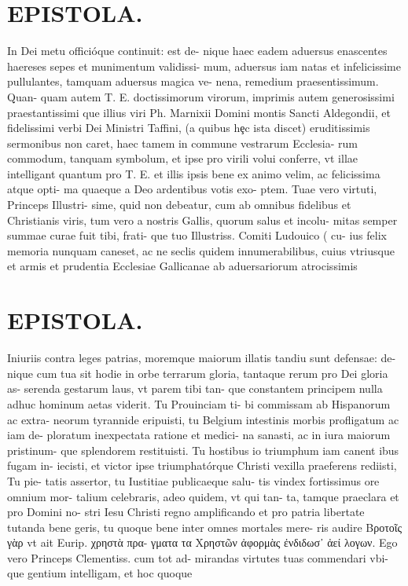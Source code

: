 \documentclass{article}
\begin{document}
\begin{pages}
\section*{EPISTOLA. }\pstart In Dei metu officióque continuit: est de- nique haec eadem aduersus enascentes haereses sepes et munimentum validissi- mum, aduersus iam natas et infelicissime pullulantes, tamquam aduersus magica ve- nena, remedium praesentissimum. Quan- quam autem T. E. doctissimorum virorum, imprimis autem generosissimi praestantissimi que illius viri Ph. Marnixii Domini montis Sancti Aldegondii, et fidelissimi verbi Dei Ministri Taffini, (a quibus hȩc ista discet) eruditissimis sermonibus non caret, haec tamem in commune vestrarum Ecclesia- rum commodum, tanquam symbolum, et ipse pro virili volui conferre, vt illae intelligant quantum pro T. E. et illis ipsis bene ex animo velim, ac felicissima atque opti- ma quaeque a Deo ardentibus votis exo- ptem. Tuae vero virtuti, Princeps Illustri- sime, quid non debeatur, cum ab omnibus fidelibus et Christianis viris, tum vero a nostris Gallis, quorum salus et incolu- mitas semper summae curae fuit tibi, frati- que tuo Illustriss. Comiti Ludouico ( cu- ius felix memoria nunquam caneset, ac ne seclis quidem innumerabilibus, cuius vtriusque et armis et prudentia Ecclesiae Gallicanae ab aduersariorum atrocissimis  \pend
\section*{EPISTOLA. }\pstart Iniuriis contra leges patrias, moremque maiorum illatis tandiu sunt defensae: de- nique cum tua sit hodie in orbe terrarum gloria, tantaque rerum pro Dei gloria as- serenda gestarum laus, vt parem tibi tan- que constantem principem nulla adhuc hominum aetas viderit. Tu Prouinciam ti- bi commissam ab Hispanorum ac extra- neorum tyrannide eripuisti, tu Belgium intestinis morbis profligatum ac iam de- ploratum inexpectata ratione et medici- na sanasti, ac in iura maiorum pristinum- que splendorem restituisti. Tu hostibus io triumphum iam canent ibus fugam in- iecisti, et victor ipse triumphatórque Christi vexilla praeferens rediisti, Tu pie- tatis assertor, tu Iustitiae publicaeque salu- tis vindex fortissimus ore omnium mor- talium celebraris, adeo quidem, vt qui tan- ta, tamque praeclara et pro Domini no- stri Iesu Christi regno amplificando et pro patria libertate tutanda bene geris, tu quoque bene inter omnes mortales mere- ris audire Βροτοῖς γὰρ vt ait Eurip. χρηστὰ πρα- γματα τα Χρηστῶν ἀφορμὰς ἐνδιδωσ᾽ ἀεί λογων. Ego vero Princeps Clementiss. cum tot ad- mirandas virtutes tuas commendari vbi- que gentium intelligam, et hoc quoque  \pend

\end{pages}
\end{document}
